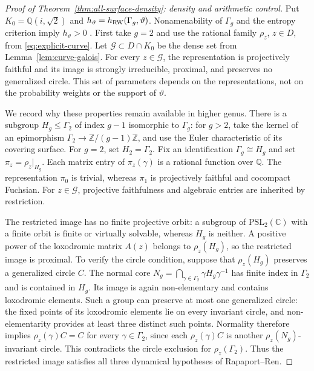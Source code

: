 \documentclass[11pt,letterpaper]{amsart}
\theoremstyle{definition}
\theoremstyle{remark}
\numberwithin{equation}{section}
\begin{document}
\begin{proof}[Proof of Theorem~\ref{thm:all-surface-density}: density and arithmetic control]
Put $K_0=\mathbb Q(i,\sqrt2)$ and
$h_\vartheta=h_{\rm RW}(\Gamma_g,\vartheta)$. Nonamenability of
$\Gamma_g$ and the entropy criterion imply $h_\vartheta>0$
\cite{KV}. First take $g=2$ and use the rational family $\rho_z$, $z\in D$,
from \eqref{eq:explicit-curve}. Let $\mathcal G\subset D\cap K_0$
be the dense set from Lemma~\ref{lem:curve-galois}. For every
$z\in\mathcal G$, the representation is projectively faithful and
its image is strongly irreducible, proximal, and preserves no generalized
circle. This set of parameters depends on the representations, not on
the probability weights or the support of $\vartheta$.

We record why these properties remain available in higher genus.
There is a subgroup $H_g\le\Gamma_2$ of index $g-1$ isomorphic to
$\Gamma_g$: for $g>2$, take the kernel of an epimorphism
$\Gamma_2\to\mathbb Z/(g-1)\mathbb Z$, and use the Euler characteristic
of its covering surface. For $g=2$, set $H_2=\Gamma_2$.
Fix an identification $\Gamma_g\cong H_g$ and set
$\pi_z=\rho_z|_{H_g}$. Each matrix entry of $\pi_z(\gamma)$ is a
rational function over $\mathbb Q$. The representation $\pi_0$ is
trivial, whereas $\pi_1$ is projectively faithful and cocompact
Fuchsian. For $z\in\mathcal G$, projective faithfulness and algebraic
entries are inherited by restriction.

The restricted image has no finite projective orbit: a subgroup of
$\mathrm{PSL}_2(\mathbb C)$ with a finite orbit is finite or virtually
solvable, whereas $H_g$ is neither. A positive power of the loxodromic
matrix $A(z)$ belongs to $\rho_z(H_g)$, so the restricted image is
proximal. To verify the circle condition, suppose that
$\rho_z(H_g)$ preserves a generalized circle $C$. The normal core
$N_g=\bigcap_{\gamma\in\Gamma_2}\gamma H_g\gamma^{-1}$ has finite
index in $\Gamma_2$ and is contained in $H_g$. Its image is again
non-elementary and contains loxodromic elements. Such a group can
preserve at most one generalized circle: the fixed points of its
loxodromic elements lie on every invariant circle, and non-elementarity
provides at least three distinct such points. Normality therefore
implies $\rho_z(\gamma)C=C$ for every $\gamma\in\Gamma_2$, since each
$\rho_z(\gamma)C$ is another $\rho_z(N_g)$-invariant circle.
This contradicts the circle exclusion for $\rho_z(\Gamma_2)$.
Thus the restricted image satisfies all three dynamical hypotheses
of Rapaport--Ren.


\end{proof}
\end{document}
